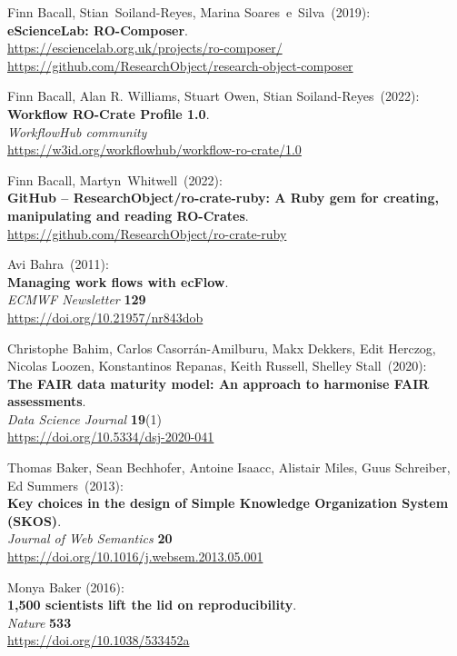 \begin{thebibliography}{9}
Finn Bacall, Stian~Soiland-Reyes, Marina Soares~e~Silva~(2019): \\
\textbf{eScienceLab: RO-Composer}.\\
\url{https://esciencelab.org.uk/projects/ro-composer/}\\
\url{https://github.com/ResearchObject/research-object-composer}

Finn Bacall, Alan R. Williams, Stuart Owen, Stian Soiland-Reyes~(2022): \\
\textbf{Workflow RO-Crate Profile 1.0}.\\
\emph{WorkflowHub community}\\
\url{https://w3id.org/workflowhub/workflow-ro-crate/1.0}

Finn Bacall, Martyn~Whitwell~(2022): \\
\textbf{GitHub -- ResearchObject/ro-crate-ruby: A Ruby gem for creating, manipulating and reading RO-Crates}.\\
\url{https://github.com/ResearchObject/ro-crate-ruby}

Avi Bahra~(2011): \\
\textbf{Managing work flows with ecFlow}.\\
\emph{ECMWF Newsletter} \textbf{129} \\
\url{https://doi.org/10.21957/nr843dob}

Christophe Bahim, Carlos Casorrán-Amilburu, Makx Dekkers, Edit Herczog, Nicolas Loozen, Konstantinos Repanas, Keith Russell, Shelley Stall~(2020): \\
\textbf{The FAIR data maturity model: An approach to harmonise FAIR assessments}.\\
\emph{Data Science Journal} \textbf{19}(1)\\
\url{https://doi.org/10.5334/dsj-2020-041}

Thomas Baker, Sean Bechhofer, Antoine Isaacc, Alistair Miles, Guus Schreiber, Ed Summers~(2013): \\
\textbf{Key choices in the design of Simple Knowledge Organization System (SKOS)}.\\
\emph{Journal of Web Semantics} \textbf{20} \\
\url{https://doi.org/10.1016/j.websem.2013.05.001}

Monya Baker (2016): \\
\textbf{1,500 scientists lift the lid on reproducibility}.\\
\emph{Nature} \textbf{533} \\
\url{https://doi.org/10.1038/533452a}


\end{thebibliography}
